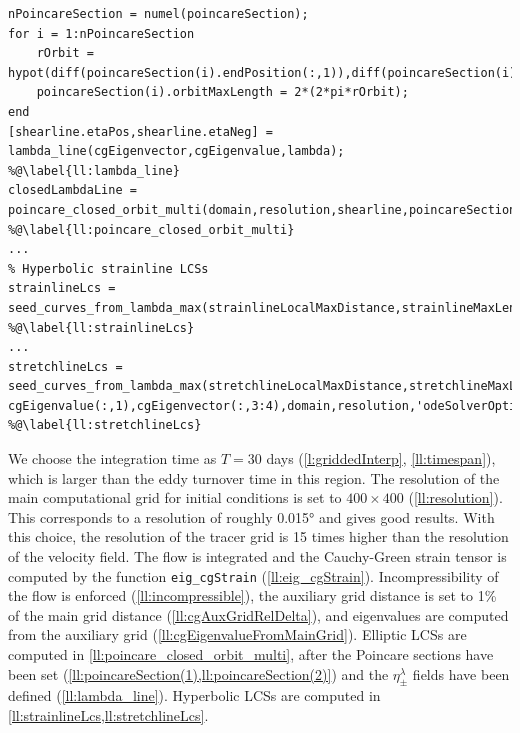 \documentclass{elsarticle}
\begin{document}
\begin{lstlisting}[caption={LCS ocean demo: Parts of the demo script included in LCS Tool to compute LCS from an ocean dataset},label=l:griddedInterp]
% Set maximum orbit length to twice the expected circumference
nPoincareSection = numel(poincareSection);
for i = 1:nPoincareSection
    rOrbit = hypot(diff(poincareSection(i).endPosition(:,1)),diff(poincareSection(i).endPosition(:,2)));
    poincareSection(i).orbitMaxLength = 2*(2*pi*rOrbit);
end
[shearline.etaPos,shearline.etaNeg] = lambda_line(cgEigenvector,cgEigenvalue,lambda); %@\label{ll:lambda_line}
closedLambdaLine = poincare_closed_orbit_multi(domain,resolution,shearline,poincareSection,'odeSolverOptions',lambdaLineOdeSolverOptions); %@\label{ll:poincare_closed_orbit_multi}
...
% Hyperbolic strainline LCSs
strainlineLcs = seed_curves_from_lambda_max(strainlineLocalMaxDistance,strainlineMaxLength,cgEigenvalue(:,2),cgEigenvector(:,1:2),domain,resolution,'odeSolverOptions',strainlineOdeSolverOptions); %@\label{ll:strainlineLcs}
...
stretchlineLcs = seed_curves_from_lambda_max(stretchlineLocalMaxDistance,stretchlineMaxLength,-cgEigenvalue(:,1),cgEigenvector(:,3:4),domain,resolution,'odeSolverOptions',stretchlineOdeSolverOptions); %@\label{ll:stretchlineLcs}
\end{lstlisting}

We choose the integration time as $T=30$ days (\cref{l:griddedInterp}, \cref{ll:timespan}), which is larger than the eddy turnover time in this region. The resolution of the main computational grid for initial conditions is set to $400 \times 400$ (\cref{ll:resolution}). This corresponds to a resolution of roughly 0.015° and gives good results. With this choice, the resolution of the tracer grid is 15 times higher than the resolution of the velocity field. The flow is integrated and the Cauchy-Green strain tensor is computed by the function \lstinline!eig_cgStrain! (\cref{ll:eig_cgStrain}). Incompressibility of the flow is enforced (\cref{ll:incompressible}), the auxiliary grid distance is set to 1\% of the main grid distance (\cref{ll:cgAuxGridRelDelta}), and eigenvalues are computed from the auxiliary grid (\cref{ll:cgEigenvalueFromMainGrid}). Elliptic LCSs are computed in \cref{ll:poincare_closed_orbit_multi}, after the Poincare sections have been set (\cref{ll:poincareSection(1),ll:poincareSection(2)}) and the $\eta_\pm^\lambda$ fields have been defined (\cref{ll:lambda_line}). Hyperbolic LCSs are computed in \cref{ll:strainlineLcs,ll:stretchlineLcs}.
\end{document}
